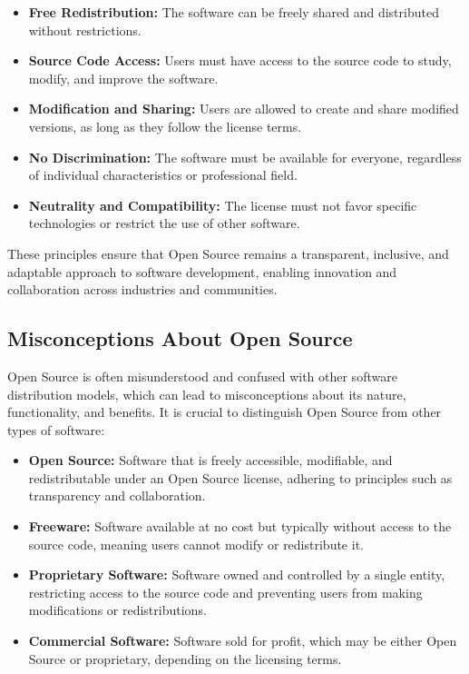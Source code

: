 \begin{itemize}
    \item \textbf{Free Redistribution:} The software can be freely shared and distributed without restrictions.
    \item \textbf{Source Code Access:} Users must have access to the source code to study, modify, and improve the software.
    \item \textbf{Modification and Sharing:} Users are allowed to create and share modified versions, as long as they follow the license terms.
    \item \textbf{No Discrimination:} The software must be available for everyone, regardless of individual characteristics or professional field.
    \item \textbf{Neutrality and Compatibility:} The license must not favor specific technologies or restrict the use of other software.
\end{itemize}

These principles ensure that Open Source remains a transparent, inclusive, and adaptable approach to software development, enabling innovation and collaboration across industries and communities.

\cite{Open_Source_Initiative_OS_definition}

\subsection{Misconceptions About Open Source}

Open Source is often misunderstood and confused with other software distribution models, which can lead to misconceptions about its nature, functionality, and benefits. 
It is crucial to distinguish Open Source from other types of software:

\begin{itemize}
    \item \textbf{Open Source:} Software that is freely accessible, modifiable, and redistributable under an Open Source license, adhering to principles such as transparency and collaboration.
    \item \textbf{Freeware:} Software available at no cost but typically without access to the source code, meaning users cannot modify or redistribute it.
    \item \textbf{Proprietary Software:} Software owned and controlled by a single entity, restricting access to the source code and preventing users from making modifications or redistributions.
    \item \textbf{Commercial Software:} Software sold for profit, which may be either Open Source or proprietary, depending on the licensing terms.
\end{itemize}

